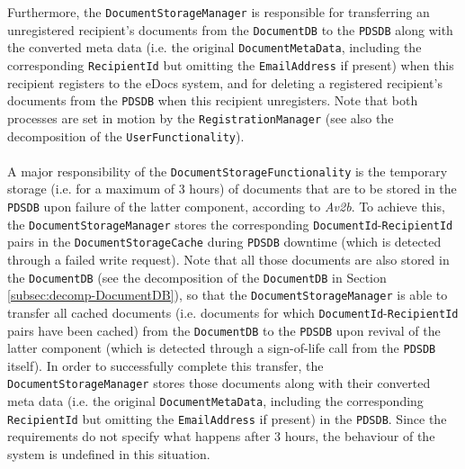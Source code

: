 \documentclass[a4paper,10pt]{article}
\begin{document}
Furthermore, the \texttt{DocumentStorageManager} is responsible for transferring an unregistered recipient's documents from the \texttt{DocumentDB} to the \texttt{PDSDB} along with the converted meta data (i.e. the original \texttt{DocumentMetaData}, including the corresponding \texttt{RecipientId} but omitting the \texttt{EmailAddress} if present) when this recipient registers to the eDocs system, and for deleting a registered recipient's documents from the \texttt{PDSDB} when this recipient unregisters. Note that both processes are set in motion by the \texttt{RegistrationManager} (see also the decomposition of the \texttt{UserFunctionality}).\\\\
A major responsibility of the \texttt{DocumentStorageFunctionality} is the temporary storage (i.e. for a maximum of 3 hours) of documents that are to be stored in the \texttt{PDSDB} upon failure of the latter component, according to \textit{Av2b}. To achieve this, the \texttt{DocumentStorageManager} stores the corresponding \texttt{DocumentId}-\texttt{RecipientId} pairs in the \texttt{DocumentStorageCache} during \texttt{PDSDB} downtime (which is detected through a failed write request). Note that all those documents are also stored in the \texttt{DocumentDB} (see the decomposition of the \texttt{DocumentDB} in Section \ref*{subsec:decomp-DocumentDB}), so that the \texttt{DocumentStorageManager} is able to transfer all cached documents (i.e. documents for which \texttt{DocumentId}-\texttt{RecipientId} pairs have been cached) from the \texttt{DocumentDB} to the \texttt{PDSDB} upon revival of the latter component (which is detected through a sign-of-life call from the \texttt{PDSDB} itself). In order to successfully complete this transfer, the \texttt{DocumentStorageManager} stores those documents along with their converted meta data (i.e. the original \texttt{DocumentMetaData}, including the corresponding \texttt{RecipientId} but omitting the \texttt{EmailAddress} if present) in the \texttt{PDSDB}. Since the requirements do not specify what happens after 3 hours, the behaviour of the system is undefined in this situation.
\end{document}
